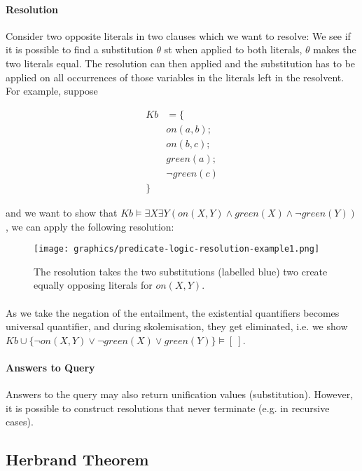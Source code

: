 \documentclass{article}
\theoremstyle{plain}
\theoremstyle{definition}
\begin{document}
\begin{multicols}{2}
\paragraph{Resolution} Consider two opposite literals in two clauses which we want to resolve: We see if it is possible to find a substitution $\theta$ st when applied to both literals, $\theta$ makes the two literals equal. The resolution can then applied and the substitution has to be applied on all occurrences of those variables in the literals left in the resolvent. For example, suppose

\begin{align*}
Kb &= \{\\
	&on(a, b);\\
	&on(b, c);\\
	&green(a);\\
	&\lnot green(c)\\
	\}&
\end{align*}

\noindent and we want to show that $Kb \models \exists X \exists Y (on(X, Y) \land green(X) \land \lnot green(Y))$, we can apply the following resolution:

\begin{figure}[H]
\centering
\texttt{[image: graphics/predicate-logic-resolution-example1.png]}
\caption{The resolution takes the two substitutions (labelled blue) two create equally opposing literals for $on(X, Y)$.}
\end{figure}

\paragraph{} As we take the negation of the entailment, the existential quantifiers becomes universal quantifier, and during skolemisation, they get eliminated, i.e. we show $Kb \cup \{\lnot on(X,Y)\lor \lnot green(X) \lor green(Y)\} \models [\ ]$.

\paragraph{Answers to Query} Answers to the query may also return unification values (substitution). However, it is possible to construct resolutions that never terminate (e.g. in recursive cases).

\subsection{Herbrand Theorem}\label{sec:HerbrandTheorem}


\end{multicols}
\end{document}
